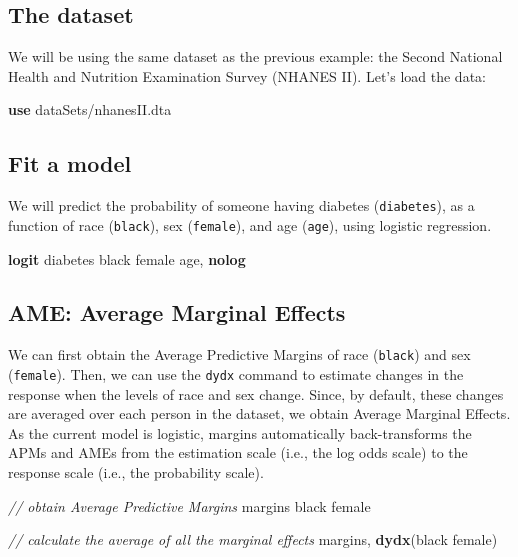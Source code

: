 \documentclass[
]{book}
\newenvironment{Shaded}{\begin{snugshade}}{\end{snugshade}}
\newcommand{\BaseNTok}[1]{\textcolor[rgb]{0.00,0.00,0.81}{#1}}
\newcommand{\CommentTok}[1]{\textcolor[rgb]{0.56,0.35,0.01}{\textit{#1}}}
\newcommand{\KeywordTok}[1]{\textcolor[rgb]{0.13,0.29,0.53}{\textbf{#1}}}
\newcommand{\NormalTok}[1]{#1}
\begin{document}
\hypertarget{the-dataset-3}{%
\subsection{The dataset}\label{the-dataset-3}}

We will be using the same dataset as the previous example: the Second National Health and Nutrition Examination Survey (NHANES II). Let's load the data:

\begin{Shaded}
\begin{Highlighting}[]
\KeywordTok{use}\NormalTok{ dataSets/nhanesII.dta}
\end{Highlighting}
\end{Shaded}

\hypertarget{fit-a-model-1}{%
\subsection{Fit a model}\label{fit-a-model-1}}

We will predict the probability of someone having diabetes (\texttt{diabetes}), as a function of race (\texttt{black}), sex (\texttt{female}), and age (\texttt{age}), using logistic regression.

\begin{Shaded}
\begin{Highlighting}[]
\KeywordTok{logit}\NormalTok{ diabetes }\BaseNTok{black}\NormalTok{ female age, }\KeywordTok{nolog} 
\end{Highlighting}
\end{Shaded}

\hypertarget{ame-average-marginal-effects}{%
\subsection{AME: Average Marginal Effects}\label{ame-average-marginal-effects}}

We can first obtain the Average Predictive Margins of race (\texttt{black}) and sex (\texttt{female}). Then, we can use the \texttt{dydx} command to estimate changes in the response when the levels of race and sex change. Since, by default, these changes are averaged over each person in the dataset, we obtain Average Marginal Effects. As the current model is logistic, margins automatically back-transforms the APMs and AMEs from the estimation scale (i.e., the log odds scale) to the response scale (i.e., the probability scale).

\begin{Shaded}
\begin{Highlighting}[]
\CommentTok{// obtain Average Predictive Margins }
\NormalTok{margins }\BaseNTok{black}\NormalTok{ female }

\CommentTok{// calculate the average of all the marginal effects }
\NormalTok{margins, }\KeywordTok{dydx}\NormalTok{(}\BaseNTok{black}\NormalTok{ female)}
\end{Highlighting}
\end{Shaded}
\end{document}
